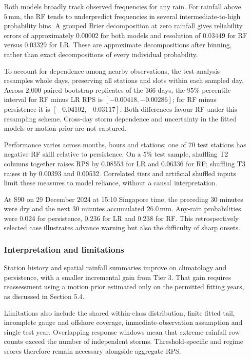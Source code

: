 \documentclass[11pt,a4paper]{article}
\begin{document}
Both models broadly track observed frequencies for any rain. For rainfall above \(5\,\mathrm{mm}\), the RF tends to underpredict frequencies in several intermediate-to-high probability bins. A grouped Brier decomposition at zero rainfall gives reliability errors of approximately 0.00002 for both models and resolution of 0.03449 for RF versus 0.03329 for LR. These are approximate decompositions after binning, rather than exact decompositions of every individual probability. 


To account for dependence among nearby observations, the test analysis resamples whole days, preserving all stations and slots within each sampled day. Across 2,000 paired bootstrap replicates of the 366 days, the \(95\%\) percentile interval for RF minus LR RPS is \([-0.00418,-0.00286]\); for RF minus persistence it is \([-0.04102,-0.03117]\). Both differences favour RF under this resampling scheme. Cross-day storm dependence and uncertainty in the fitted models or motion prior are not captured.


Performance varies across months, hours and stations; one of 70 test stations has negative RF skill relative to persistence. On a \(5\%\) test sample, shuffling T2 columns together raises RPS by 0.08553 for LR and 0.06336 for RF; shuffling T3 raises it by 0.00393 and 0.00532. Correlated tiers and artificial shuffled inputs limit these measures to model reliance, without a causal interpretation. 


At S90 on 29 December 2024 at 15:10 Singapore time, the preceding 30 minutes were dry and the next 30 minutes accumulated \(26.0\,\mathrm{mm}\). Any-rain probabilities were 0.024 for persistence, 0.236 for LR and 0.238 for RF. This retrospectively selected case illustrates advance warning but also the difficulty of sharp onsets.


\subsubsection*{Interpretation and limitations}
{}


Station history and spatial rainfall summaries improve on climatology and persistence, with a smaller incremental gain from Tier 3. That gain requires reassessment using a motion prior estimated only on the permitted fitting years, as discussed in Section 5.4.


Limitations also include the shared within-class distribution, finite fitted tail, incomplete gauge and offshore coverage, immediate-observation assumption and single test year. Overlapping response windows mean that extreme-rainfall row counts exceed the number of independent storms. Threshold-specific and regime scores therefore remain necessary alongside aggregate RPS.
\end{document}
